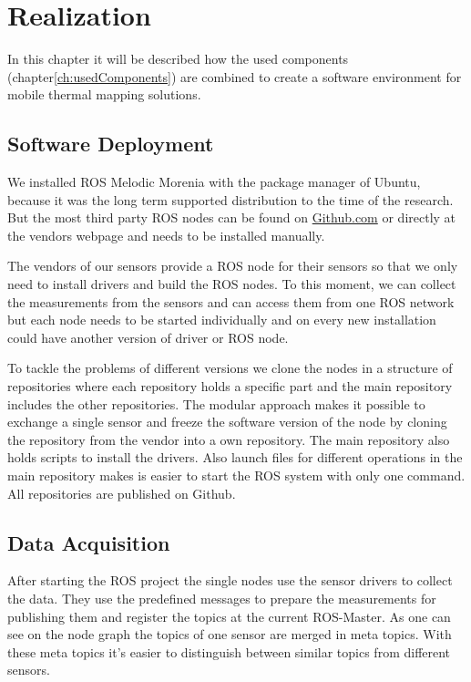 \chapter{Realization}\label{ch:realization}

In this chapter it will be described how the used components (chapter\ref{ch:usedComponents}) are combined to create a software environment for mobile thermal mapping solutions.

\section{Software Deployment}\label{ch:realization:sec:softwareDeployment}

We installed \ac{ROS} Melodic Morenia with the package manager of Ubuntu, because it was the long term supported distribution to the time of the research.
But the most third party \ac{ROS} nodes can be found on \href{https://github.com}{Github.com} or directly at the vendors webpage and needs to be installed manually.

The vendors of our sensors provide a \ac{ROS} node for their sensors so that we only need to install drivers and build the \ac{ROS} nodes.
To this moment, we can collect the measurements from the sensors and can access them from one \ac{ROS} network but each node needs to be started individually and on every new installation could have another version of driver or \ac{ROS} node.

To tackle the problems of different versions we clone the nodes in a structure of repositories where each repository holds a specific part and the main repository includes the other repositories.
The modular approach makes it possible to exchange a single sensor and freeze the software version of the node by cloning the repository from the vendor into a own repository.
The main repository also holds scripts to install the drivers.
Also launch files for different operations in the main repository makes is easier to start the ROS system with only one command.
All repositories are published on Github. 

\section{Data Acquisition}\label{ch:realization:sec:dataAcquisition}

After starting the \ac{ROS} project the single nodes use the sensor drivers to collect the data.
They use the predefined messages to prepare the measurements for publishing them and register the topics at the current ROS-Master. 
As one can see on the node graph the topics of one sensor are merged in meta topics.
With these meta topics it's easier to distinguish between similar topics from different sensors. 

